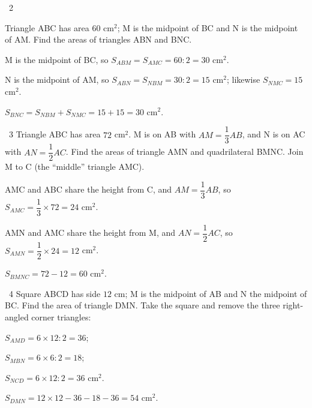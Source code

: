 \begin{exbox}{\ExWord\ 2}
\begin{minipage}[t]{0.6\linewidth}
Triangle ABC has area $60$ cm$^2$; M is the midpoint of BC and N is the midpoint of AM. Find the areas of triangles ABN and BNC.
\end{minipage}\hfill
\begin{minipage}[t]{0.36\linewidth}\vspace{0pt}\centering
{}
\end{minipage}
\guide
M is the midpoint of BC, so $S_{ABM}=S_{AMC}=60:2=30$ cm$^2$.\par
N is the midpoint of AM, so $S_{ABN}=S_{NBM}=30:2=15$ cm$^2$; likewise $S_{NMC}=15$ cm$^2$.\par
$S_{BNC}=S_{NBM}+S_{NMC}=15+15=30$ cm$^2$.
\end{exbox}
\gap
\begin{exbox}{\ExWord\ 3}
Triangle ABC has area $72$ cm$^2$. M is on AB with $AM=\dfrac13AB$, and N is on AC with $AN=\dfrac12AC$. Find the areas of triangle AMN and quadrilateral BMNC.
\guide
Join M to C (the ``middle'' triangle AMC).\par
AMC and ABC share the height from C, and $AM=\dfrac13AB$, so $S_{AMC}=\dfrac13\times72=24$ cm$^2$.\par
AMN and AMC share the height from M, and $AN=\dfrac12AC$, so $S_{AMN}=\dfrac12\times24=12$ cm$^2$.\par
$S_{BMNC}=72-12=60$ cm$^2$.
\end{exbox}
\gap
\begin{exbox}{\ExWord\ 4}
Square ABCD has side $12$ cm; M is the midpoint of AB and N the midpoint of BC. Find the area of triangle DMN.
\guide
Take the square and remove the three right-angled corner triangles:\par
$S_{AMD}=6\times12:2=36$;\par $S_{MBN}=6\times6:2=18$;\par $S_{NCD}=6\times12:2=36$ cm$^2$.\par
$S_{DMN}=12\times12-36-18-36=54$ cm$^2$.
\end{exbox}
